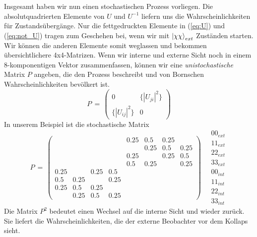 \documentclass[12pt]{article}
\begin{document}
Insgesamt haben wir nun einen stochastischen Prozess vorliegen. Die absolutquadrierten Elemente von $U$ und $U^{-1}$ liefern uns die Wahrscheinlichkeiten für Zustandsübergänge. Nur die fettgedruckten Elemente in (\ref{eq:U}) und (\ref{eq:not_U}) tragen zum Geschehen bei, wenn wir mit $\ket{\chi\chi}_{ext}$ Zuständen starten. Wir können die anderen Elemente somit weglassen und bekommen übersichtlichere 4x4-Matrizen. Wenn wir interne und externe Sicht noch in einem 8-komponentigen Vektor zusammenfassen, können wir eine \emph{unistochastische} Matrix $P$ angeben, die den Prozess beschreibt und von Bornschen Wahrscheinlichkeiten bevölkert ist.
\begin{equation}
P\, =\,
\begin{pmatrix}
0 & \{|U_{ji}|^2\} \\
\{|U_{ij}|^2\} & 0
\end{pmatrix}
\end{equation}
In unserem Beispiel ist die stochastische Matrix
\begin{equation}
P\, =\,
\begin{pmatrix}
&&&& 0.25 & 0.5 & 0.25 & \\
&&&& & 0.25 & 0.5 & 0.25 \\
&&&& 0.25 & & 0.25 & 0.5 \\
&&&& 0.5 & 0.25 & & 0.25 \\ 
0.25 & & 0.25 & 0.5 &&&& \\
0.5 & 0.25 & & 0.25 &&&& \\
0.25 & 0.5 & 0.25 & &&&& \\
& 0.25 & 0.5 & 0.25 &&&& 
\end{pmatrix}
\quad
\begin{matrix}
00_{ext} \\ 11_{ext} \\ 22_{ext} \\ 33_{ext} \\ 00_{int} \\ 11_{int} \\ 22_{int} \\ 33_{int}
\end{matrix}
\end{equation}
Die Matrix $P^2$ bedeutet einen Wechsel auf die interne Sicht und wieder zurück. Sie liefert die Wahrscheinlichkeiten, die der externe Beobachter vor dem Kollaps sieht.
\end{document}
